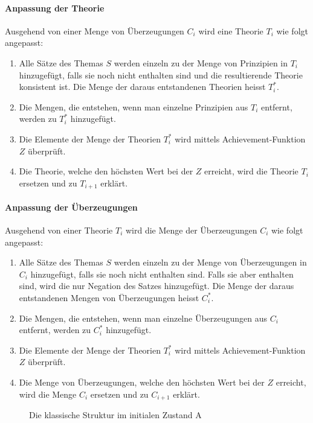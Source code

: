 \documentclass{article}
\begin{document}
\paragraph{Anpassung der Theorie}
Ausgehend von einer Menge von Überzeugungen $C_i$ wird eine Theorie $T_i$ wie folgt angepasst: 
\begin{enumerate}
    \item \label{1} Alle Sätze des Themas $S$ werden einzeln zu der Menge von Prinzipien in $T_i$ hinzugefügt, falls sie noch nicht enthalten sind und die resultierende Theorie konsistent ist. Die Menge der daraus entstandenen Theorien heisst $T_i^*$.
    \item \label{2}Die Mengen, die entstehen, wenn man einzelne Prinzipien aus $T_i$ entfernt, werden zu $T_i^*$ hinzugefügt.
    \item \label{3}Die Elemente der Menge der Theorien $T_i^*$ wird mittels Achievement-Funktion $Z$ überprüft.
    \item \label{4}Die Theorie, welche den höchsten Wert bei der $Z$ erreicht, wird die Theorie $T_i$ ersetzen und zu $T_{i+1}$ erklärt.
\end{enumerate}

\paragraph{Anpassung der Überzeugungen}
Ausgehend von einer Theorie $T_i$ wird die Menge der Überzeugungen $C_i$ wie folgt angepasst:
\begin{enumerate}
    \item \label{c1} Alle Sätze des Themas $S$ werden einzeln zu der Menge von Überzeugungen in $C_i$ hinzugefügt, falls sie noch nicht enthalten sind. Falls sie aber enthalten sind, wird die nur Negation des Satzes hinzugefügt. Die Menge der daraus entstandenen Mengen von Überzeugungen heisst $C_i^*$.
    \item \label{c2} Die Mengen, die entstehen, wenn man einzelne Überzeugungen aus $C_i$ entfernt, werden zu $C_i^*$ hinzugefügt.
    \item \label{c3} Die Elemente der Menge der Theorien $T_i^*$ wird mittels Achievement-Funktion $Z$ überprüft.
    \item \label{c4}Die Menge von Überzeugungen, welche den höchsten Wert bei der $Z$ erreicht, wird die Menge $C_i$ ersetzen und zu $C_{i+1}$ erklärt.
\end{enumerate}

\begin{figure}
  \centering
  
  \caption{Die klassische Struktur im initialen Zustand A\label{fig:classset-initial1}}
\end{figure}
\end{document}
